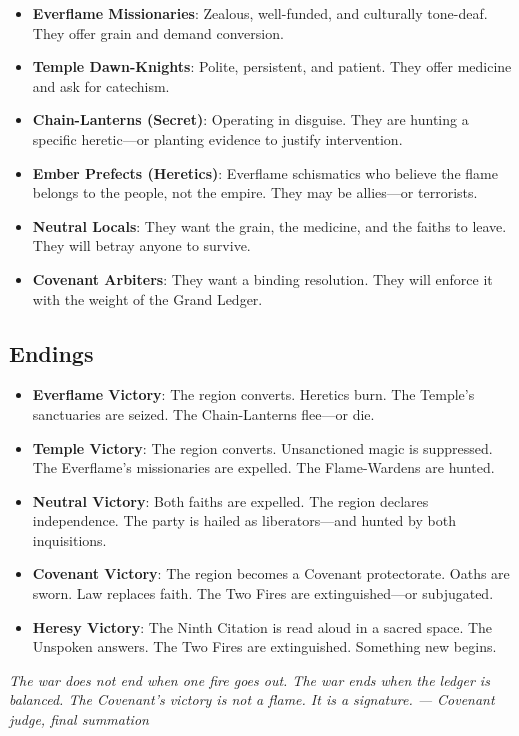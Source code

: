 \documentclass{book}
\newcommand{\citation}[1]{\textcolor{marginalia}{\small\textit{#1}}}
\begin{document}
\begin{itemize}
\item \textbf{Everflame Missionaries}: Zealous, well-funded, and culturally tone-deaf. They offer grain and demand conversion.
\item \textbf{Temple Dawn-Knights}: Polite, persistent, and patient. They offer medicine and ask for catechism.
\item \textbf{Chain-Lanterns (Secret)}: Operating in disguise. They are hunting a specific heretic---or planting evidence to justify intervention.
\item \textbf{Ember Prefects (Heretics)}: Everflame schismatics who believe the flame belongs to the people, not the empire. They may be allies---or terrorists.
\item \textbf{Neutral Locals}: They want the grain, the medicine, and the faiths to leave. They will betray anyone to survive.
\item \textbf{Covenant Arbiters}: They want a binding resolution. They will enforce it with the weight of the Grand Ledger.
\end{itemize}

\subsection{Endings}

\begin{itemize}
\item \textbf{Everflame Victory}: The region converts. Heretics burn. The Temple's sanctuaries are seized. The Chain-Lanterns flee---or die.
\item \textbf{Temple Victory}: The region converts. Unsanctioned magic is suppressed. The Everflame's missionaries are expelled. The Flame-Wardens are hunted.
\item \textbf{Neutral Victory}: Both faiths are expelled. The region declares independence. The party is hailed as liberators---and hunted by both inquisitions.
\item \textbf{Covenant Victory}: The region becomes a Covenant protectorate. Oaths are sworn. Law replaces faith. The Two Fires are extinguished---or subjugated.
\item \textbf{Heresy Victory}: The Ninth Citation is read aloud in a sacred space. The Unspoken answers. The Two Fires are extinguished. Something new begins.
\end{itemize}

\citation{The war does not end when one fire goes out. The war ends when the ledger is balanced. The Covenant's victory is not a flame. It is a signature. --- Covenant judge, final summation}
\end{document}

